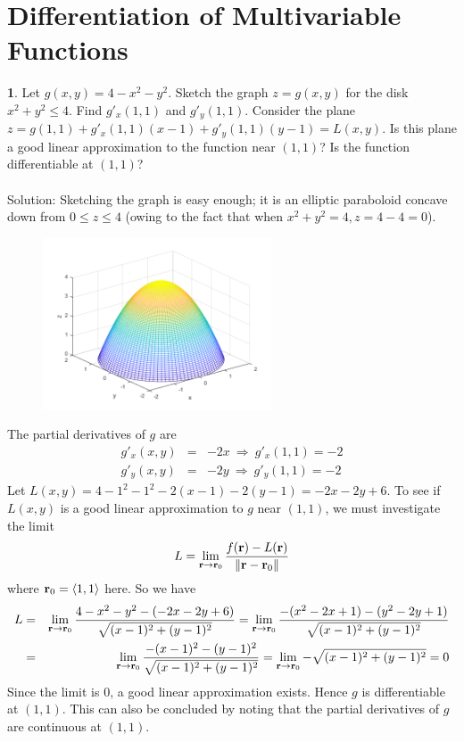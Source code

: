 \documentclass[12pt]{amsbook}
\newcommand{\la}{\langle}
\newcommand{\ra}{\rangle}
\begin{document}
\section{Differentiation of Multivariable Functions}
\noindent
{\small\bf 1}. Let $g(x,y)=4-x^2-y^2$. Sketch the graph $z = g(x, y)$ for the disk $x^2+y^2\leq 4$. Find $g'_x(1,1)$ and $g'_y(1,1)$. Consider the plane $z=g(1,1)+g'_x(1,1)(x-1)+g'_y(1,1)(y-1)=L(x,y)$. Is this plane a good linear approximation to the function near $(1, 1)$? Is the function differentiable
at $(1, 1)$?
\\
\\
{\sc Solution}: Sketching the graph is easy enough; it is an elliptic paraboloid concave down from $0 \leq z \leq 4$ (owing to the fact that when $x^2+y^2=4, z=4-4=0$). 
\begin{center}
\includegraphics[width=3.5in,height=2.0in]{3_21_1.png}
\end{center}
The partial derivatives of $g$ are
\begin{eqnarray*}
g'_x(x,y)&=&-2x \ \Rightarrow \ g'_x(1,1)=-2 \\
g'_y(x,y)&=&-2y \ \Rightarrow \ g'_y(1,1)=-2 
\end{eqnarray*}
Let $L(x,y)=4-1^2-1^2-2(x-1)-2(y-1)=-2x-2y+6$.
To see if $L(x,y)$ is a good linear approximation to $g$ near $(1,1)$, we must investigate the limit
$$L=\lim_{{\bf r} \rightarrow {\bf r}_0}\frac{f({\bf r})-L({\bf r})}{\|{\bf r}-{\bf r}_0\|}$$
where ${\bf r}_0=\la 1,1 \ra$ here. So we have
\begin{eqnarray*}
L&=&\lim_{{\bf r} \rightarrow {\bf r}_0}\frac{4-x^2-y^2-(-2x-2y+6)}{\sqrt{(x-1)^2+(y-1)^2}}=\lim_{{\bf r} \rightarrow {\bf r}_0}\frac{-(x^2-2x+1)-(y^2-2y+1)}{\sqrt{(x-1)^2+(y-1)^2}} \\
&=&\lim_{{\bf r} \rightarrow {\bf r}_0}\frac{-(x-1)^2-(y-1)^2}{\sqrt{(x-1)^2+(y-1)^2}}=\lim_{{\bf r} \rightarrow {\bf r}_0}-\sqrt{(x-1)^2+(y-1)^2}=0
\end{eqnarray*}
Since the limit is $0$, a good linear approximation exists. Hence $g$ is differentiable at $(1,1)$. This can also be concluded by noting that the partial derivatives of $g$ are continuous at $(1,1)$.
\end{document}
